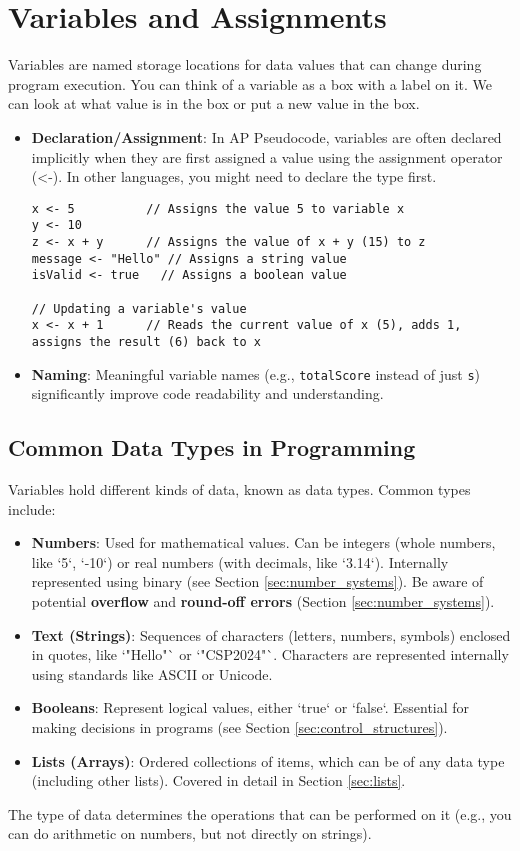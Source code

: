 \documentclass[11pt,oneside]{book}
\begin{document}
\section{Variables and Assignments}
\label{sec:variables_assignment}
Variables are named storage locations for data values that can change during program execution. You can think of a variable as a box with a label on it. We can look at what value is in the box or put a new value in the box.

\begin{itemize}
\item \textbf{Declaration/Assignment}: In AP Pseudocode, variables are often declared implicitly when they are first assigned a value using the assignment operator (<-). In other languages, you might need to declare the type first.
\begin{lstlisting}[language={}, label={lst:assignment_detail}, caption={AP Pseudocode: Assignment Examples}]
x <- 5          // Assigns the value 5 to variable x
y <- 10
z <- x + y      // Assigns the value of x + y (15) to z
message <- "Hello" // Assigns a string value
isValid <- true   // Assigns a boolean value

// Updating a variable's value
x <- x + 1      // Reads the current value of x (5), adds 1, assigns the result (6) back to x
\end{lstlisting}
\item \textbf{Naming}: Meaningful variable names (e.g., \texttt{totalScore} instead of just \texttt{s}) significantly improve code readability and understanding.
\end{itemize}

\subsection*{Common Data Types in Programming}
Variables hold different kinds of data, known as data types. Common types include:
\begin{itemize}
    \item \textbf{Numbers}: Used for mathematical values. Can be integers (whole numbers, like `5`, `-10`) or real numbers (with decimals, like `3.14`). Internally represented using binary (see Section \ref{sec:number_systems}). Be aware of potential \textbf{overflow} and \textbf{round-off errors} (Section \ref{sec:number_systems}).
    \item \textbf{Text (Strings)}: Sequences of characters (letters, numbers, symbols) enclosed in quotes, like `"Hello"` or `"CSP2024"`. Characters are represented internally using standards like ASCII or Unicode.
    \item \textbf{Booleans}: Represent logical values, either `true` or `false`. Essential for making decisions in programs (see Section \ref{sec:control_structures}).
    \item \textbf{Lists (Arrays)}: Ordered collections of items, which can be of any data type (including other lists). Covered in detail in Section \ref{sec:lists}.
\end{itemize}
The type of data determines the operations that can be performed on it (e.g., you can do arithmetic on numbers, but not directly on strings).
\end{document}
